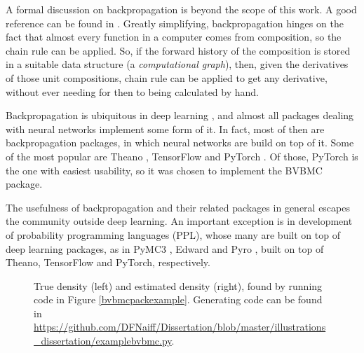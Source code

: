 A formal discussion on backpropagation is beyond the scope of this work. A good reference can be found in \cite{Goodfellow_2016}. Greatly simplifying, backpropagation hinges on the fact that almost every function in a computer comes from composition, so the chain rule can be applied. So, if the forward history of the composition is stored in a suitable data structure (a \textit{computational graph}), then, given the derivatives of those unit compositions, chain rule can be applied to get any derivative, without ever needing for then to being calculated by hand.

Backpropagation is ubiquitous in deep learning , and almost all packages dealing with neural networks implement some form of it. In fact, most of then are backpropagation packages, in which neural networks are build on top of it. Some of the most popular are Theano \cite{Theano_2016}, TensorFlow \cite{Abadi_2015} and PyTorch \cite{Paszke_2017}. Of those, PyTorch is the one with easiest usability, so it was chosen to implement the BVBMC package.

The usefulness of backpropagation and their related packages in general escapes the community outside deep learning. An important exception is in development of probability programming languages (PPL), whose many are built on top of deep learning packages, as in PyMC3 \cite{Salvatier_2016}, Edward \cite{Tran_2016} and Pyro \cite{Bingham_2018}, built on top of Theano, TensorFlow and PyTorch, respectively.

\begin{figure}
	\centering

	\caption[\label{bvbmcpackfigs}True density and estimated density found by running code in Figure \ref{bvbmcpackexample}]{\label{bvbmcpackfigs}True density (left) and estimated density (right), found by running code in Figure \ref{bvbmcpackexample}. Generating code can be found in \url{https://github.com/DFNaiff/Dissertation/blob/master/illustrations_dissertation/examplebvbmc.py}.}
\end{figure}
